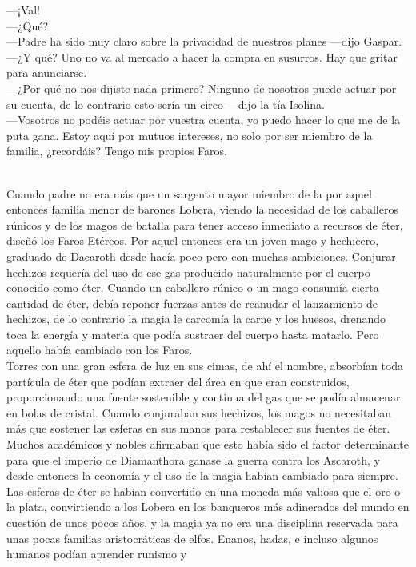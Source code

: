 \documentclass[
  letterpaper,
]{krantz}
\begin{document}
---¡Val!\\
---¿Qué?\\
---Padre ha sido muy claro sobre la privacidad de nuestros planes
---dijo Gaspar.\\
---¿Y qué? Uno no va al mercado a hacer la compra en susurros. Hay que
gritar para anunciarse.\\
---¿Por qué no nos dijiste nada primero? Ninguno de nosotros puede
actuar por su cuenta, de lo contrario esto sería un circo ---dijo la tía
Isolina.\\
---Vosotros no podéis actuar por vuestra cuenta, yo puedo hacer lo que
me de la puta gana. Estoy aquí por mutuos intereses, no solo por ser
miembro de la familia, ¿recordáis? Tengo mis propios Faros.\\
\strut \\
Cuando padre no era más que un sargento mayor miembro de la por aquel
entonces familia menor de barones Lobera, viendo la necesidad de los
caballeros rúnicos y de los magos de batalla para tener acceso inmediato
a recursos de éter, diseñó los Faros Etéreos. Por aquel entonces era un
joven mago y hechicero, graduado de Dacaroth desde hacía poco pero con
muchas ambiciones. Conjurar hechizos requería del uso de ese gas
producido naturalmente por el cuerpo conocido como éter. Cuando un
caballero rúnico o un mago consumía cierta cantidad de éter, debía
reponer fuerzas antes de reanudar el lanzamiento de hechizos, de lo
contrario la magia le carcomía la carne y los huesos, drenando toca la
energía y materia que podía sustraer del cuerpo hasta matarlo. Pero
aquello había cambiado con los Faros.\\
Torres con una gran esfera de luz en sus cimas, de ahí el nombre,
absorbían toda partícula de éter que podían extraer del área en que eran
construidos, proporcionando una fuente sostenible y continua del gas que
se podía almacenar en bolas de cristal. Cuando conjuraban sus hechizos,
los magos no necesitaban más que sostener las esferas en sus manos para
restablecer sus fuentes de éter. Muchos académicos y nobles afirmaban
que esto había sido el factor determinante para que el imperio de
Diamanthora ganase la guerra contra los Ascaroth, y desde entonces la
economía y el uso de la magia habían cambiado para siempre. Las esferas
de éter se habían convertido en una moneda más valiosa que el oro o la
plata, convirtiendo a los Lobera en los banqueros más adinerados del
mundo en cuestión de unos pocos años, y la magia ya no era una
disciplina reservada para unas pocas familias aristocráticas de elfos.
Enanos, hadas, e incluso algunos humanos podían aprender runismo y
\end{document}
